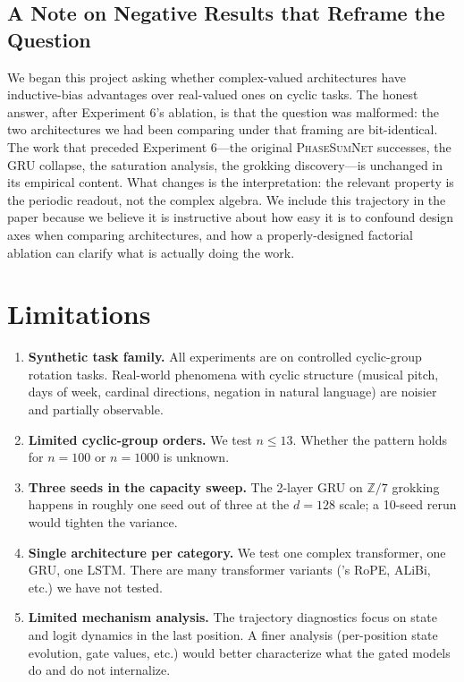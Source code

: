 \documentclass[11pt]{article}
\theoremstyle{definition}
\newcommand{\Z}{\mathbb{Z}}
\begin{document}
\subsection{A Note on Negative Results that Reframe the Question}

We began this project asking whether complex-valued architectures
have inductive-bias advantages over real-valued ones on cyclic
tasks. The honest answer, after Experiment 6's ablation, is that
the question was malformed: the two architectures we had been
comparing under that framing are bit-identical. The work that
preceded Experiment 6---the original \textsc{PhaseSumNet} successes,
the GRU collapse, the saturation analysis, the grokking
discovery---is unchanged in its empirical content. What changes is
the interpretation: the relevant property is the periodic readout,
not the complex algebra. We include this trajectory in the paper
because we believe it is instructive about how easy it is to
confound design axes when comparing architectures, and how a
properly-designed factorial ablation can clarify what is actually
doing the work.


\section{Limitations}
\label{sec:limitations}

\begin{enumerate}[itemsep=2pt]
\item \textbf{Synthetic task family.} All experiments are on
controlled cyclic-group rotation tasks. Real-world phenomena with
cyclic structure (musical pitch, days of week, cardinal directions,
negation in natural language) are noisier and partially observable.

\item \textbf{Limited cyclic-group orders.} We test $n \leq 13$.
Whether the pattern holds for $n = 100$ or $n = 1000$ is unknown.

\item \textbf{Three seeds in the capacity sweep.} The 2-layer GRU
on $\Z/7$ grokking happens in roughly one seed out of three at the
$d=128$ scale; a 10-seed rerun would tighten the variance.

\item \textbf{Single architecture per category.} We test one complex
transformer, one GRU, one LSTM. There are many transformer variants
(\citet{su2024roformer}'s RoPE, ALiBi, etc.) we have not tested.

\item \textbf{Limited mechanism analysis.} The trajectory diagnostics
focus on state and logit dynamics in the last position. A finer
analysis (per-position state evolution, gate values, etc.) would
better characterize what the gated models do and do not internalize.
\end{enumerate}
\end{document}
